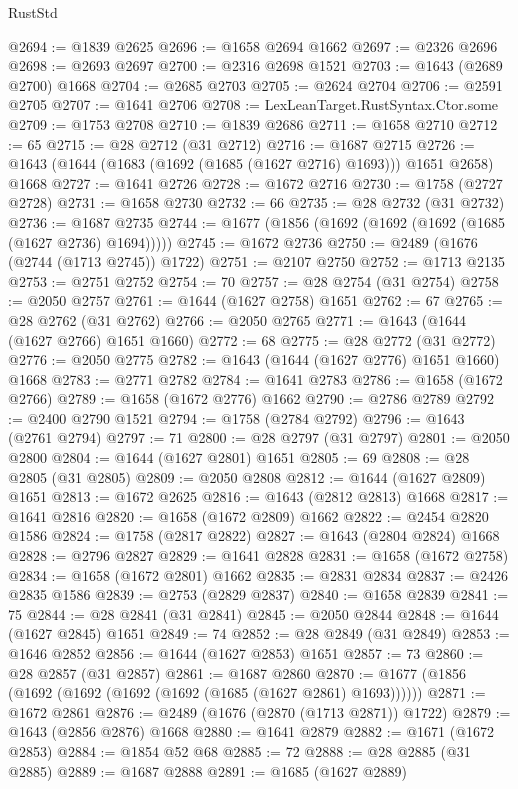 \begin{lexlean}{RustStd}
\begin{coremodule}
@2694 := @1839 @2625
@2696 := @1658 @2694 @1662
@2697 := @2326 @2696
@2698 := @2693 @2697
@2700 := @2316 @2698 @1521
@2703 := @1643 (@2689 @2700) @1668
@2704 := @2685 @2703
@2705 := @2624 @2704
@2706 := @2591 @2705
@2707 := @1641 @2706
@2708 := LexLeanTarget.RustSyntax.Ctor.some
@2709 := @1753 @2708
@2710 := @1839 @2686
@2711 := @1658 @2710
@2712 := 65
@2715 := @28 @2712 (@31 @2712)
@2716 := @1687 @2715
@2726 := @1643 (@1644 (@1683 (@1692 (@1685 (@1627 @2716) @1693))) @1651 @2658) @1668
@2727 := @1641 @2726
@2728 := @1672 @2716
@2730 := @1758 (@2727 @2728)
@2731 := @1658 @2730
@2732 := 66
@2735 := @28 @2732 (@31 @2732)
@2736 := @1687 @2735
@2744 := @1677 (@1856 (@1692 (@1692 (@1692 (@1685 (@1627 @2736) @1694)))))
@2745 := @1672 @2736
@2750 := @2489 (@1676 (@2744 (@1713 @2745)) @1722)
@2751 := @2107 @2750
@2752 := @1713 @2135
@2753 := @2751 @2752
@2754 := 70
@2757 := @28 @2754 (@31 @2754)
@2758 := @2050 @2757
@2761 := @1644 (@1627 @2758) @1651
@2762 := 67
@2765 := @28 @2762 (@31 @2762)
@2766 := @2050 @2765
@2771 := @1643 (@1644 (@1627 @2766) @1651 @1660)
@2772 := 68
@2775 := @28 @2772 (@31 @2772)
@2776 := @2050 @2775
@2782 := @1643 (@1644 (@1627 @2776) @1651 @1660) @1668
@2783 := @2771 @2782
@2784 := @1641 @2783
@2786 := @1658 (@1672 @2766)
@2789 := @1658 (@1672 @2776) @1662
@2790 := @2786 @2789
@2792 := @2400 @2790 @1521
@2794 := @1758 (@2784 @2792)
@2796 := @1643 (@2761 @2794)
@2797 := 71
@2800 := @28 @2797 (@31 @2797)
@2801 := @2050 @2800
@2804 := @1644 (@1627 @2801) @1651
@2805 := 69
@2808 := @28 @2805 (@31 @2805)
@2809 := @2050 @2808
@2812 := @1644 (@1627 @2809) @1651
@2813 := @1672 @2625
@2816 := @1643 (@2812 @2813) @1668
@2817 := @1641 @2816
@2820 := @1658 (@1672 @2809) @1662
@2822 := @2454 @2820 @1586
@2824 := @1758 (@2817 @2822)
@2827 := @1643 (@2804 @2824) @1668
@2828 := @2796 @2827
@2829 := @1641 @2828
@2831 := @1658 (@1672 @2758)
@2834 := @1658 (@1672 @2801) @1662
@2835 := @2831 @2834
@2837 := @2426 @2835 @1586
@2839 := @2753 (@2829 @2837)
@2840 := @1658 @2839
@2841 := 75
@2844 := @28 @2841 (@31 @2841)
@2845 := @2050 @2844
@2848 := @1644 (@1627 @2845) @1651
@2849 := 74
@2852 := @28 @2849 (@31 @2849)
@2853 := @1646 @2852
@2856 := @1644 (@1627 @2853) @1651
@2857 := 73
@2860 := @28 @2857 (@31 @2857)
@2861 := @1687 @2860
@2870 := @1677 (@1856 (@1692 (@1692 (@1692 (@1692 (@1685 (@1627 @2861) @1693))))))
@2871 := @1672 @2861
@2876 := @2489 (@1676 (@2870 (@1713 @2871)) @1722)
@2879 := @1643 (@2856 @2876) @1668
@2880 := @1641 @2879
@2882 := @1671 (@1672 @2853)
@2884 := @1854 @52 @68
@2885 := 72
@2888 := @28 @2885 (@31 @2885)
@2889 := @1687 @2888
@2891 := @1685 (@1627 @2889)

\end{coremodule}
\end{lexlean}
